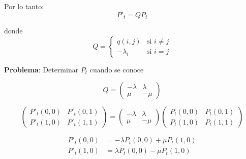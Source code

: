 \documentclass[12pt,a4paper]{article}
\begin{document}
Por lo tanto:
\begin{equation*}
P'_t = Q P_t
\end{equation*}

donde
\begin{equation*}
Q = \begin{cases}
q(i,j) & \text{si } i \neq j \\
-\lambda_i & \text{si } i = j
\end{cases}
\end{equation*}


\textbf{Problema}: Determinar $P_t$ cuando se conoce

\begin{equation*}
Q = \begin{pmatrix}
-\lambda & \lambda \\
\mu & -\mu
\end{pmatrix}
\end{equation*}

\begin{center}
\end{center}

\begin{equation*}
\begin{pmatrix}
P'_t(0,0) & P'_t(0,1) \\
P'_t(1,0) & P'_t(1,1)
\end{pmatrix} = \begin{pmatrix}
-\lambda & \lambda \\
\mu & -\mu
\end{pmatrix} \begin{pmatrix}
P_t(0,0) & P_t(0,1) \\
P_t(1,0) & P_t(1,1)
\end{pmatrix}
\end{equation*}

\begin{align*}
P'_t(0,0) &= -\lambda P_t(0,0) + \mu P_t(1,0) \\
P'_t(1,0) &= \lambda P_t(0,0) - \mu P_t(1,0)
\end{align*}
\end{document}
